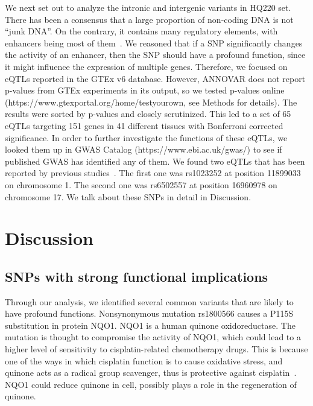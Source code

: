 \documentclass[a4paper, 12pt]{article}
\begin{document}
				We next set out to analyze the intronic and intergenic variants in HQ220 set. There has been a consensus that a large proportion of non-coding DNA is not \textquotedblleft junk DNA\textquotedblright. On the contrary, it contains many regulatory elements, with enhancers being most of them~\parencite{Pennacchio2013}. We reasoned that if a SNP significantly changes the activity of an enhancer, then the SNP should have a profound function, since it might influence the expression of multiple genes. Therefore, we focused on eQTLs reported in the GTEx v6 database. However, ANNOVAR does not report p-values from GTEx experiments in its output, so we tested p-values online (https://www.gtexportal.org/home/testyourown, see Methods for details). The results were sorted by p-values and closely scrutinized. This led to a set of 65 eQTLs targeting 151 genes in 41 different tissues with Bonferroni corrected significance. In order to further investigate the functions of these eQTLs, we looked them up in GWAS Catalog (https://www.ebi.ac.uk/gwas/) to see if published GWAS has identified any of them. We found two eQTLs that has been reported by previous studies~\parencite{DelGreco2011, Lauc2013}. The first one was rs1023252 at position 11899033 on chromosome 1. The second one was rs6502557 at position 16960978 on chromosome 17. We talk about these SNPs in detail in Discussion.
				
		\section*{Discussion}
		
			\subsection*{SNPs with strong functional implications}
				
				Through our analysis, we identified several common variants that are likely to have profound functions. Nonsynonymous mutation rs1800566 causes a P115S substitution in protein NQO1. NQO1 is a human quinone oxidoreductase. The mutation is thought to compromise the activity of NQO1, which could lead to a higher level of sensitivity to cisplatin-related chemotherapy drugs. This is because one of the ways in which cisplatin function is to cause oxidative stress, and quinone acts as a radical group scavenger, thus is protective against cisplatin~\parencite{Kim2014a, Oh2014, Kim2016b}. NQO1 could reduce quinone in cell, possibly plays a role in the regeneration of quinone.
				
\end{document}
